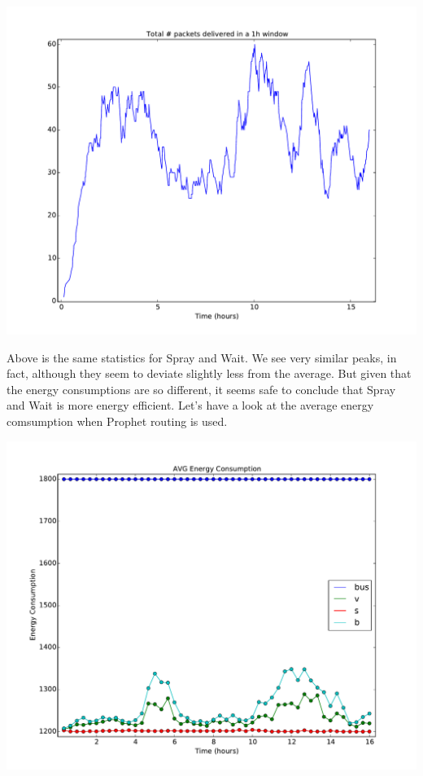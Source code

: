 \documentclass[conference]{IEEEtran}
\begin{document}
\includegraphics[scale=0.38]{../one_1.5.1-RC2/plots/SprayAndWait_NUM_DELIVERED_PKTS_IN_WND.pdf}

Above is the same statistics for Spray and Wait. We see very similar peaks, in fact, although they seem to deviate slightly less from the average. But given that the energy consumptions are so different, it seems safe to conclude that Spray and Wait is more energy efficient. Let's have a look at the average energy comsumption when Prophet routing is used.

\includegraphics[scale=0.38]{../one_1.5.1-RC2/plots/ProphetRouter_AVG_ENERGY_CONSUMPTION.pdf}
\end{document}
